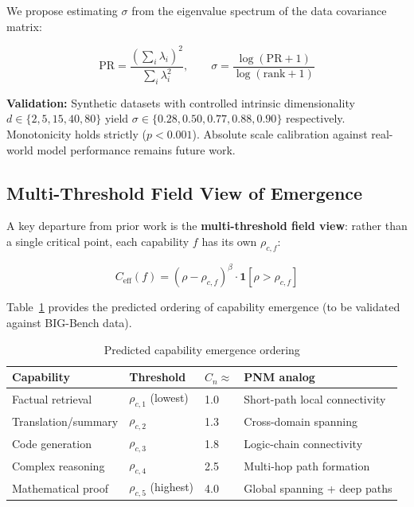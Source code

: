 \documentclass[11pt,a4paper]{article}
\newcommand{\Ceff}{C_{\text{eff}}}
\begin{document}
We propose estimating $\sigma$ from the eigenvalue spectrum of the data
covariance matrix:

\begin{equation}
  \text{PR} = \frac{(\sum_i \lambda_i)^2}{\sum_i \lambda_i^2}, \qquad
  \sigma = \frac{\log(\text{PR}+1)}{\log(\text{rank}+1)}
  \label{eq:sigma}
\end{equation}

\textbf{Validation:} Synthetic datasets with controlled intrinsic dimensionality
$d \in \{2, 5, 15, 40, 80\}$ yield $\sigma \in \{0.28, 0.50, 0.77, 0.88, 0.90\}$
respectively. Monotonicity holds strictly ($p < 0.001$). Absolute scale
calibration against real-world model performance remains future work.

\subsection{Multi-Threshold Field View of Emergence}

A key departure from prior work \citep{lubana2024percolation} is the
\textbf{multi-threshold field view}: rather than a single critical point,
each capability $f$ has its own $\rho_{c,f}$:

\begin{equation}
  \Ceff(f) = (\rho - \rho_{c,f})^\beta \cdot \mathbf{1}[\rho > \rho_{c,f}]
\end{equation}

Table~\ref{tab:thresholds} provides the predicted ordering of capability
emergence (to be validated against BIG-Bench data).

\begin{table}[h]
\centering
\caption{Predicted capability emergence ordering}
\label{tab:thresholds}
\begin{tabular}{llll}
\toprule
\textbf{Capability} & \textbf{Threshold} & \textbf{$C_n \approx$} & \textbf{PNM analog} \\
\midrule
Factual retrieval   & $\rho_{c,1}$ (lowest) & 1.0 & Short-path local connectivity \\
Translation/summary & $\rho_{c,2}$          & 1.3 & Cross-domain spanning \\
Code generation     & $\rho_{c,3}$          & 1.8 & Logic-chain connectivity \\
Complex reasoning   & $\rho_{c,4}$          & 2.5 & Multi-hop path formation \\
Mathematical proof  & $\rho_{c,5}$ (highest)& 4.0 & Global spanning + deep paths \\
\bottomrule
\end{tabular}
\end{table}
\end{document}

